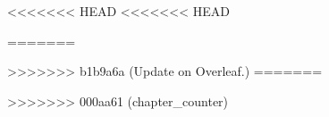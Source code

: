 

% 
% 
\setcounter{chapter}{1}
<<<<<<< HEAD
<<<<<<< HEAD

% 
% 
=======


>>>>>>> b1b9a6a (Update on Overleaf.)
=======

% 
% 
>>>>>>> 000aa61 (chapter_counter)
% 
% 

